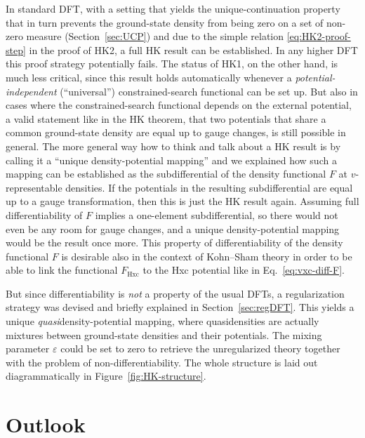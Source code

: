 \documentclass[journal=apcach,manuscript=article,layout=twocolumn]{achemso}
\newcommand{\eps}{\varepsilon}
\begin{document}
In standard DFT, with a setting that yields the unique-continuation property that in turn prevents the ground-state density from being zero on a set of non-zero measure (Section~\ref{sec:UCP}) and due to the simple relation \eqref{eq:HK2-proof-step} in the proof of HK2, a full HK result can be established. In any higher DFT this proof strategy potentially fails. The status of HK1, on the other hand, is much less critical, since this result holds automatically whenever a \emph{potential-independent} (``universal'') constrained-search functional can be set up. But also in cases where the constrained-search functional depends on the external potential, a valid statement like in the HK theorem, that two potentials that share a common ground-state density are equal up to gauge changes, is still possible in general. The more general way how to think and talk about a HK result is by calling it a ``unique density-potential mapping'' and we explained how such a mapping can be established as the subdifferential of the density functional $F$ at $v$-representable densities. If the potentials in the resulting subdifferential are equal up to a gauge transformation, then this is just the HK result again. Assuming full differentiability of $F$ implies a one-element subdifferential, so there would not even be any room for gauge changes, and a unique density-potential mapping would be the result once more. This property of differentiability of the density functional $F$ is desirable also in the context of Kohn--Sham theory in order to be able to link the functional $F_\mathrm{Hxc}$ to the Hxc potential like in Eq.~\eqref{eq:vxc-diff-F}.

But since differentiability is \emph{not} a property of the usual DFTs, a regularization strategy was devised and briefly explained in Section~\ref{sec:regDFT}. This yields a unique \emph{quasi}density-potential mapping, where quasidensities are actually mixtures between ground-state densities and their potentials. The mixing parameter $\eps$ could be set to zero to retrieve the unregularized theory together with the problem of non-differentiability. The whole structure is laid out diagrammatically in Figure~\ref{fig:HK-structure}.



\section{Outlook}
\label{sec:outlook}
\end{document}
